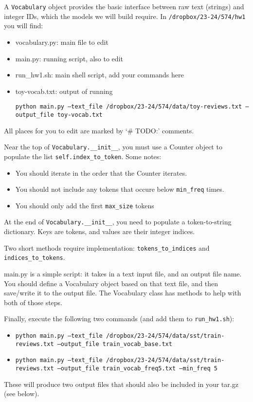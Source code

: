 \documentclass[11pt]{article}
\begin{document}
A \texttt{Vocabulary} object provides the basic interface between raw text (strings) and integer IDs, which the models we will build require.  In \texttt{/dropbox/23-24/574/hw1} you will find:
\begin{itemize}
  \item vocabulary.py: main file to edit
  \item main.py: running script, also to edit
  \item run\_hw1.sh: main shell script, add your commands here
  \item toy-vocab.txt: output of running 
  
    \texttt{python main.py --text\_file /dropbox/23-24/574/data/toy-reviews.txt --output\_file toy-vocab.txt}
\end{itemize}
All places for you to edit are marked by `\# TODO:' comments.

\vspace{2em}
 Near the top of \texttt{Vocabulary.\_\_init\_\_}, you must use a Counter object to populate the list \texttt{self.index\_to\_token}.  Some notes:
\begin{itemize}
  \item You should iterate in the order that the Counter iterates.
  \item You should not include any tokens that occure below \texttt{min\_freq} times.
  \item You should only add the first \texttt{max\_size} tokens
\end{itemize}

\vspace{2em}
  At the end of \texttt{Vocabulary.\_\_init\_\_}, you need to populate a token-to-string dictionary.  Keys are tokens, and values are their integer indices.

\vspace{2em}
  Two short methods require implementation: \texttt{tokens\_to\_indices} and \texttt{indices\_to\_tokens}.

\vspace{2em}
  main.py is a simple script: it takes in a text input file, and an output file name.  You should define a Vocabulary object based on that text file, and then save/write it to the output file.  The Vocabulary class has methods to help with both of those steps.

\vspace{2em}
  Finally, execute the following two commands (and add them to \texttt{run\_hw1.sh}):
\begin{itemize}
  \item \texttt{python main.py --text\_file /dropbox/23-24/574/data/sst/train-reviews.txt --output\_file train\_vocab\_base.txt}
  \item \texttt{python main.py --text\_file /dropbox/23-24/574/data/sst/train-reviews.txt --output\_file train\_vocab\_freq5.txt --min\_freq 5}
\end{itemize}
These will produce two output files that should also be included in your tar.gz (see below).
\end{document}

